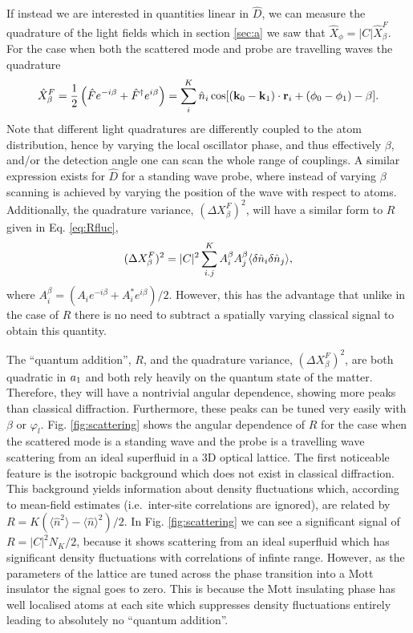 If instead we are interested in quantities linear in $\hat{D}$, we can
measure the quadrature of the light fields which in section
\ref{sec:a} we saw that $\hat{X}_\phi = |C| \hat{X}^F_\beta$. For the
case when both the scattered mode and probe are travelling waves the
quadrature
\begin{equation} 
  \label{eq:Xtrav}
  \hat{X}^F_\beta = \frac{1}{2} \left( \hat{F} e^{-i \beta} +
    \hat{F}^\dagger e^{i \beta} \right) = \sum_i^K \hat{n}_i\cos[(\mathbf{k}_0 - \mathbf{k}_1) \cdot
  \mathbf{r}_i + (\phi_0 - \phi_1) - \beta].
\end{equation} 
Note that different light quadratures are differently coupled to the
atom distribution, hence by varying the local oscillator phase, and
thus effectively $\beta$, and/or the detection angle one can scan the
whole range of couplings. A similar expression exists for $\hat{D}$
for a standing wave probe, where instead of varying $\beta$ scanning
is achieved by varying the position of the wave with respect to
atoms. Additionally, the quadrature variance, $(\Delta X^F_\beta)^2$,
will have a similar form to $R$ given in Eq. \eqref{eq:Rfluc},
\begin{equation}
  (\Delta X^F_\beta)^2 = |C|^2 \sum_{i.j}^K A_i^\beta A_j^\beta
  \langle \delta \hat{n}_i \delta \hat{n}_j \rangle,
\end{equation}
where $A_i^\beta = (A_i e^{-i\beta} + A_i^* e^{i \beta})/2$.  However,
this has the advantage that unlike in the case of $R$ there is no need
to subtract a spatially varying classical signal to obtain this
quantity.

The ``quantum addition'', $R$, and the quadrature variance,
$(\Delta X^F_\beta)^2$, are both quadratic in $a_1$ and both rely
heavily on the quantum state of the matter. Therefore, they will have
a nontrivial angular dependence, showing more peaks than classical
diffraction. Furthermore, these peaks can be tuned very easily with
$\beta$ or $\varphi_l$. Fig. \ref{fig:scattering} shows the angular
dependence of $R$ for the case when the scattered mode is a standing
wave and the probe is a travelling wave scattering from an ideal
superfluid in a 3D optical lattice. The first noticeable feature is
the isotropic background which does not exist in classical
diffraction. This background yields information about density
fluctuations which, according to mean-field estimates (i.e.~inter-site
correlations are ignored), are related by
$R = K( \langle \hat{n}^2 \rangle - \langle \hat{n} \rangle^2 )/2$. In
Fig. \ref{fig:scattering} we can see a significant signal of
$R = |C|^2 N_K/2$, because it shows scattering from an ideal
superfluid which has significant density fluctuations with
correlations of infinte range. However, as the parameters of the
lattice are tuned across the phase transition into a Mott insulator
the signal goes to zero. This is because the Mott insulating phase has
well localised atoms at each site which suppresses density
fluctuations entirely leading to absolutely no ``quantum addition''.

